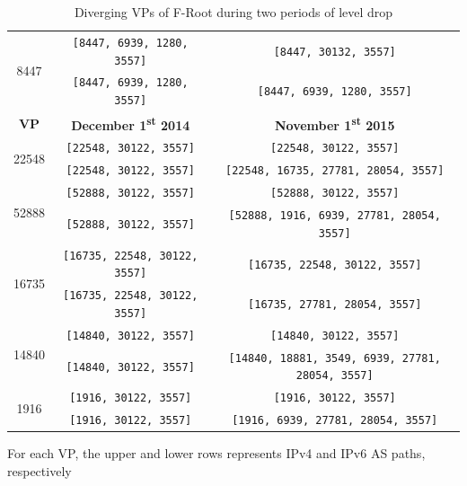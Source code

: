 \begin{table}[!ht]
\begin{tabular}{c c c}
		\multirow{2}{*}{8447} & \texttt{\footnotesize [8447, 6939, 1280, 3557]}  & \texttt{\footnotesize [8447, 30132, 3557]} \\
		& \texttt{\footnotesize[8447, 6939, 1280, 3557]}  & \texttt{\footnotesize[8447, 6939, 1280, 3557]} \\ \hline\hline
		
		\textbf{VP} & \textbf{December 1\textsuperscript{st} 2014}	& \textbf{November 1\textsuperscript{st} 2015} \\ \hline\hline
		\multirow{2}{*}{22548} & \texttt{\footnotesize [22548, 30122, 3557]}  & \texttt{\footnotesize [22548, 30122, 3557]} \\
		& \texttt{\footnotesize [22548, 30122, 3557]}  & \texttt{\footnotesize [22548, 16735, 27781, 28054, 3557]} \\ \hline
		
		\multirow{2}{*}{52888} & \texttt{\footnotesize [52888, 30122, 3557]}  & \texttt{\footnotesize [52888, 30122, 3557]} \\
		& \texttt{\footnotesize [52888, 30122, 3557]}  & \texttt{\footnotesize [52888, 1916, 6939, 27781, 28054, 3557]} \\ \hline
		
		\multirow{2}{*}{16735} & \texttt{\footnotesize [16735, 22548, 30122, 3557]}  & \texttt{\footnotesize [16735, 22548, 30122, 3557]} \\
		& \texttt{\footnotesize [16735, 22548, 30122, 3557]}  & \texttt{\footnotesize [16735, 27781, 28054, 3557]} \\ \hline
		
		\multirow{2}{*}{14840} & \texttt{\footnotesize [14840, 30122, 3557]}  & \texttt{\footnotesize [14840, 30122, 3557]} \\
		& \texttt{\footnotesize [14840, 30122, 3557]}  & \texttt{\footnotesize [14840, 18881, 3549, 6939, 27781, 28054, 3557]} \\ \hline
		
		\multirow{2}{*}{1916} & \texttt{\footnotesize [1916, 30122, 3557]}  & \texttt{\footnotesize [1916, 30122, 3557]} \\
		& \texttt{\footnotesize [1916, 30122, 3557]}  & \texttt{\footnotesize [1916, 6939, 27781, 28054, 3557]} \\ \hline
	\end{tabular}
	\begin{tablenotes}
		\item For each VP, the upper and lower rows represents IPv4 and IPv6 AS paths, respectively
	\end{tablenotes}
	\caption{Diverging VPs of F-Root during two periods of level drop}
	\label{table:ch04:convergence:f-root-analysis}
\end{table}

